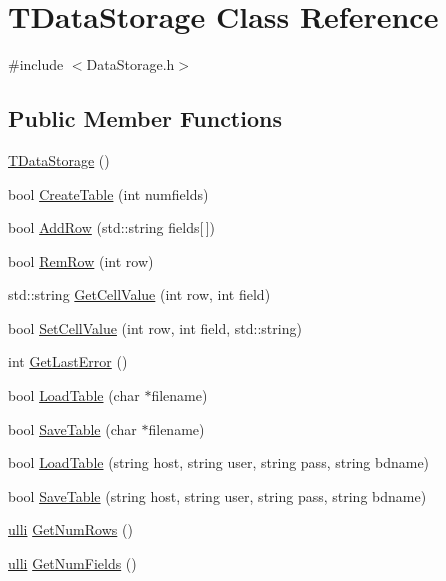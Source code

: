 \hypertarget{classTDataStorage}{
\section{TDataStorage Class Reference}
\label{d8/dd5/classTDataStorage}
}


{\ttfamily \#include $<$DataStorage.h$>$}

\subsection*{Public Member Functions}
\begin{DoxyCompactItemize}
\item 
\hyperlink{classTDataStorage_a802b42b3baa27a6692b9a5b6558f6409}{TDataStorage} ()
\item 
bool \hyperlink{classTDataStorage_a75ec42bb1307550c2de44999cb92d92e}{CreateTable} (int numfields)
\item 
bool \hyperlink{classTDataStorage_a15a350e202a45bb8d7d2a8135b165c5e}{AddRow} (std::string fields\mbox{[}$\,$\mbox{]})
\item 
bool \hyperlink{classTDataStorage_ac656716f7001d0a514c051b0d2c59372}{RemRow} (int row)
\item 
std::string \hyperlink{classTDataStorage_abf1412607bd604f2566f3949d16cb98c}{GetCellValue} (int row, int field)
\item 
bool \hyperlink{classTDataStorage_a3139ece68b017f2969bcc5a1ff0c3e2d}{SetCellValue} (int row, int field, std::string)
\item 
int \hyperlink{classTDataStorage_a39f6e1320c1bac311f73df79f4d80de3}{GetLastError} ()
\item 
bool \hyperlink{classTDataStorage_a05020dfe2220dab047722a28fee98183}{LoadTable} (char $\ast$filename)
\item 
bool \hyperlink{classTDataStorage_a8b8c45eea4458dfff0ef5ee4ce0de349}{SaveTable} (char $\ast$filename)
\item 
bool \hyperlink{classTDataStorage_a374f01932ab4a74855f2166cbe452443}{LoadTable} (string host, string user, string pass, string bdname)
\item 
bool \hyperlink{classTDataStorage_a145f420ff51a10a3abc72cca9d0c4196}{SaveTable} (string host, string user, string pass, string bdname)
\item 
\hyperlink{DataStorage_8h_afebafa022413aaef27ce1b01cbfa9791}{ulli} \hyperlink{classTDataStorage_a416f8363838c7f4d4ed3a946debd70a3}{GetNumRows} ()
\item 
\hyperlink{DataStorage_8h_afebafa022413aaef27ce1b01cbfa9791}{ulli} \hyperlink{classTDataStorage_a33c567156162b28bed51260d57b0af07}{GetNumFields} ()
\end{DoxyCompactItemize}


